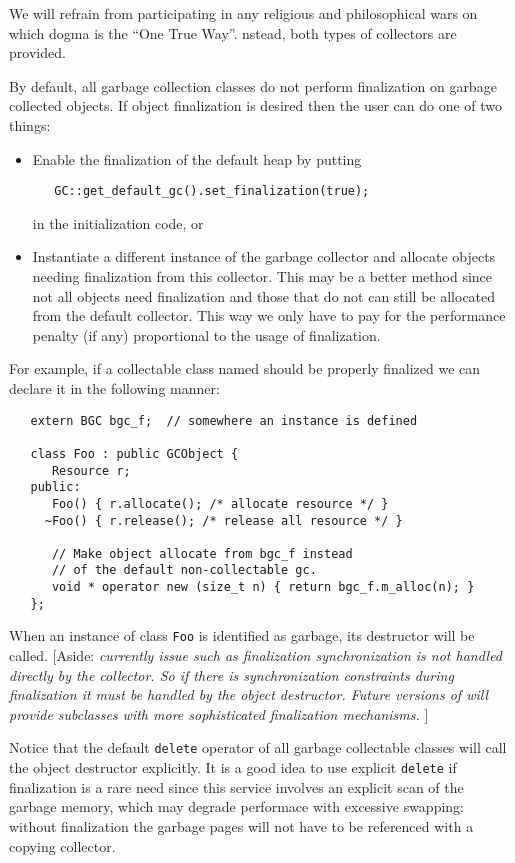    We will refrain from participating in any religious and philosophical
wars on which dogma is the ``One True Way''. 
nstead, both types of collectors are provided.

   By default, all garbage collection classes do 
not perform finalization on garbage 
collected objects.  If object finalization is desired then the user
can do one of two things:
\begin{itemize}
   \item Enable the finalization of the default heap by putting
\begin{verbatim}
   GC::get_default_gc().set_finalization(true);
\end{verbatim}
   in the initialization code, or
   \item Instantiate a different instance of the garbage collector
    and allocate objects needing finalization from this collector.
    This may be a better method since not all objects need finalization
    and those that do not can still be allocated from the default collector.
    This way we only have to pay for the performance penalty (if any)
    proportional to the usage of finalization.
\end{itemize}

   For example, if a collectable class named  should be properly
finalized we can declare it in the following manner:

\begin{verbatim}
   extern BGC bgc_f;  // somewhere an instance is defined

   class Foo : public GCObject {
      Resource r;
   public:
      Foo() { r.allocate(); /* allocate resource */ }
     ~Foo() { r.release(); /* release all resource */ }

      // Make object allocate from bgc_f instead
      // of the default non-collectable gc.
      void * operator new (size_t n) { return bgc_f.m_alloc(n); }
   };
\end{verbatim}

   When an instance of class \verb|Foo| is identified as garbage, its
destructor will be called.  [Aside: {\it currently issue such as 
finalization synchronization is not handled directly by the collector.
So if there is synchronization constraints during finalization it must
be handled by the object destructor.  Future versions of \Prop{} will
provide subclasses with more sophisticated finalization mechanisms.} ]

   Notice that the default \verb|delete| operator of all garbage collectable
classes will call the object destructor explicitly.  It is a good idea to use
explicit \verb|delete| if finalization is a rare need since this service
involves an explicit scan of the garbage memory, which may degrade performace
with excessive swapping: without finalization the garbage pages will not 
have to be referenced with a copying collector.

